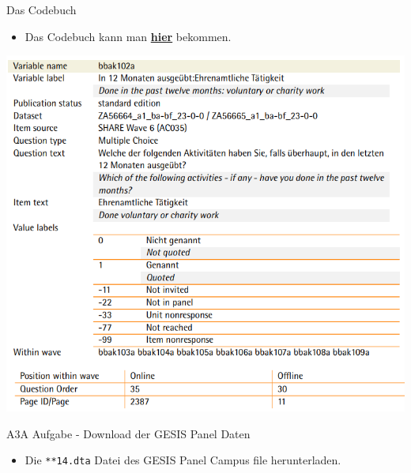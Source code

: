 \documentclass[ignorenonframetext,]{beamer}
\providecommand{\tightlist}{%
  \setlength{\itemsep}{0pt}\setlength{\parskip}{0pt}}
\begin{document}
\begin{frame}{Das Codebuch}

\begin{itemize}
\tightlist
\item
  Das Codebuch kann man
  \href{https://www.gesis.org/gesis-panel/documentation/}{\textbf{hier}}
  bekommen.
\end{itemize}

\includegraphics{figure/cdb_bbak102a.PNG}

\end{frame}

\begin{frame}[fragile]{A3A Aufgabe - Download der GESIS Panel Daten}

\begin{itemize}
\tightlist
\item
  Die \texttt{**14.dta} Datei des GESIS Panel Campus file herunterladen.
\end{itemize}

\end{frame}
\end{document}
